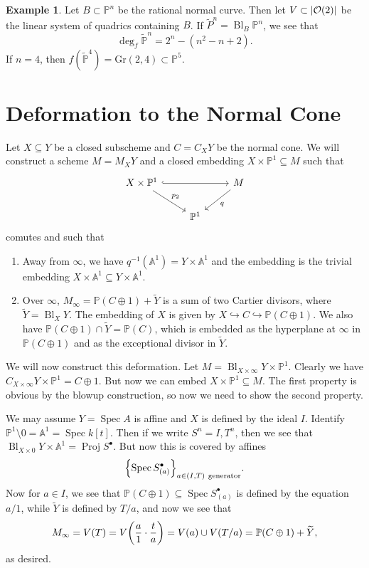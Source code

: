 \documentclass[leqno, openany]{memoir}
\theoremstyle{definition}
\newtheorem{exm}[thm]{Example}
\theoremstyle{remark}
\theoremstyle{plain}
\theoremstyle{definition}
\theoremstyle{remark}
\newcommand{\A}{\mathbb{A}}
\renewcommand{\P}{\mathbb{P}}
\newcommand{\mc}[1]{\mathcal{#1}}
\newcommand{\mr}[1]{\mathrm{#1}}
\newcommand{\wt}[1]{\widetilde{#1}}
\DeclareMathOperator{\Spec}{Spec}
\DeclareMathOperator{\Proj}{Proj}
\DeclareMathOperator{\Bl}{Bl}
\begin{document}
\begin{exm}
    Let $B \subset \P^n$ be the rational normal curve. Then let $V \subset \abs{\mc{O}(2)}$ be the linear system of quadrics containing $B$. If $\wt{P}^n = \Bl_B \P^n$, we see that 
    \[ \deg_f \wt{\P}^n = 2^n - (n^2-n+2). \]
    If $n = 4$, then $f(\wt{\P}^4) = \mr{Gr}(2,4) \subset \P^5$.
\end{exm}

\section{Deformation to the Normal Cone}%
\label{sec:deformation_to_the_normal_cone}

Let $X \subseteq Y$ be a closed subscheme and $C = C_X Y$ be the normal cone. We will construct a scheme $M = M_X Y$ and a closed embedding $X \times \P^1 \subseteq M$ such that
\begin{equation*}
\begin{tikzcd}
    X \times \P^1 \ar[hookrightarrow]{rr} \ar{dr}{p_2} & & M \ar{dl}{q} \\
                                                       & \P^1
\end{tikzcd}
\end{equation*}
comutes and such that
\begin{enumerate}
    \item Away from $\infty$, we have $q^{-1}(\A^1) = Y \times \A^1$ and the embedding is the trivial embedding $X \times \A^1 \subseteq Y \times \A^1$.
    \item Over $\infty$, $M_{\infty} = \P(C \oplus 1) + \wt{Y}$ is a sum of two Cartier divisors, where $\wt{Y} = \Bl_X Y$. The embedding of $X$ is given by $X \hookrightarrow C \hookrightarrow \P(C \oplus 1)$. We also have $\P(C \oplus 1) \cap \wt{Y} = \P(C)$, which is embedded as the hyperplane at $\infty$ in $\P(C \oplus 1)$ and as the exceptional divisor in $\wt{Y}$.
\end{enumerate}

We will now construct this deformation. Let $M = \Bl_{X \times \infty} Y \times \P^1$. Clearly we have $C_{X \times \infty} Y \times \P^1 = C \oplus 1$. But now we can embed $X \times \P^1 \subseteq M$. The first property is obvious by the blowup construction, so now we need to show the second property.

We may assume $Y = \Spec A$ is affine and $X$ is defined by the ideal $I$. Identify $\P^1 \setminus 0 = \A^1 = \Spec k[t]$. Then if we write $S^n = {I,T}^n$, then we see that $\Bl_{X \times 0} Y \times \A^1 = \Proj S^{\bullet}$. But now this is covered by affines 
\[ \qty{\Spec S^{\bullet}_{(a)}}_{a \in (I, T)\ \text{generator}}. \]
Now for $a \in I$, we see that $\P(C \oplus 1) \subseteq \Spec S^{\bullet}_{(a)}$ is defined by the equation $a/1$, while $\wt{Y}$ is defined by $T/a$, and now we see that 
\[ M_{\infty} = V(T) = V\qty(\frac{a}{1} \cdot \frac{t}{a}) = V(a) \cup V(T/a) = \P(C \oplus 1) + \wt{Y}, \]
as desired.
\end{document}
